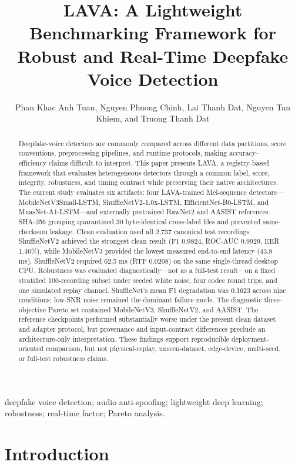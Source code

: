 \documentclass[10pt,journal]{IEEEtran}
\title{LAVA: A Lightweight Benchmarking Framework for Robust and Real-Time Deepfake Voice Detection}
\author{Phan Khac Anh Tuan, Nguyen Phuong Chinh, Lai Thanh Dat, Nguyen Tan Khiem, and Truong Thanh Dat}
\begin{document}
\maketitle
\begin{abstract}
Deepfake-voice detectors are commonly compared across different data partitions, score conventions, preprocessing pipelines, and runtime protocols, making accuracy–efficiency claims difficult to interpret. This paper presents LAVA, a registry-based framework that evaluates heterogeneous detectors through a common label, score, integrity, robustness, and timing contract while preserving their native architectures. The current study evaluates six artifacts: four LAVA-trained Mel-sequence detectors—MobileNetV3Small-LSTM, ShuffleNetV2-1.0x-LSTM, EfficientNet-B0-LSTM, and MnasNet-A1-LSTM—and externally pretrained RawNet2 and AASIST references. SHA-256 grouping quarantined 30 byte-identical cross-label files and prevented same-checksum leakage. Clean evaluation used all 2,737 canonical test recordings. ShuffleNetV2 achieved the strongest clean result (F1 0.9824, ROC-AUC 0.9929, EER 1.46\%), while MobileNetV3 provided the lowest measured end-to-end latency (43.8 ms). ShuffleNetV2 required 62.5 ms (RTF 0.0208) on the same single-thread desktop CPU. Robustness was evaluated diagnostically—not as a full-test result—on a fixed stratified 100-recording subset under seeded white noise, four codec round trips, and one simulated replay channel. ShuffleNet's mean F1 degradation was 0.1623 across nine conditions; low-SNR noise remained the dominant failure mode. The diagnostic three-objective Pareto set contained MobileNetV3, ShuffleNetV2, and AASIST. The reference checkpoints performed substantially worse under the present clean dataset and adapter protocol, but provenance and input-contract differences preclude an architecture-only interpretation. These findings support reproducible deployment-oriented comparison, but not physical-replay, unseen-dataset, edge-device, multi-seed, or full-test robustness claims.
\end{abstract}
\begin{IEEEkeywords}deepfake voice detection; audio anti-spoofing; lightweight deep learning; robustness; real-time factor; Pareto analysis.\end{IEEEkeywords}
\section{Introduction}
\end{document}
